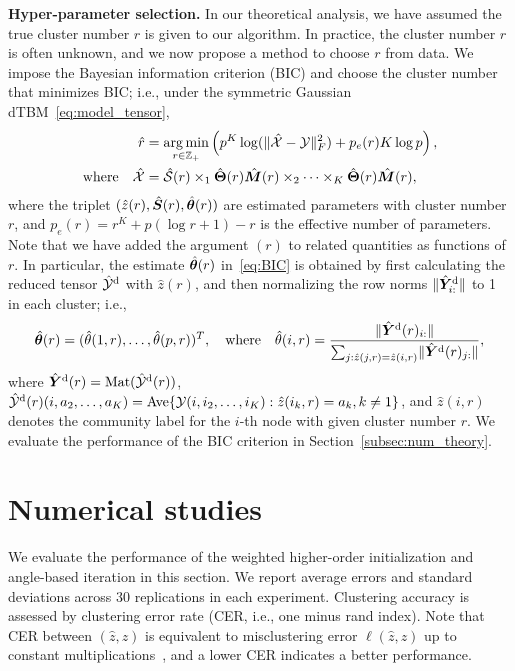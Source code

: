 \documentclass[lettersize,onecolumn,journal]{IEEEtran}
\theoremstyle{definition}
\theoremstyle{definition}
\newcommand{\of}[1]{\left(#1\right)}
\begin{document}
{\bf Hyper-parameter selection.} In our theoretical analysis, we have assumed the true cluster number $r$ is given to our algorithm. In practice, the cluster number $r$ is often unknown, and we now propose a method to choose $r$ from data. We impose the Bayesian information criterion (BIC) and choose the cluster number that minimizes BIC; i.e., under the symmetric Gaussian dTBM~\eqref{eq:model_tensor},
\begin{align}\label{eq:BIC}
 \hat r &= \argmin_{r \in \mathbb{Z}_+ } \of{p^K \log(\onormSize{}{\hat \tX - \tY}_F^2)  + p_e(r) K \log p},\\
 \text{where}  \quad \hat \tX &= \hat \tS(r) \times_1 \hat \mTheta(r) \hat \mM(r) \times_2 \cdots \times_K \hat \mTheta(r) \hat \mM(r),
\end{align}
where the triplet $(\hat z(r), \hat {\bm S}(r),\hat {\boldsymbol{\theta}}(r))$ are estimated parameters with cluster number $r$, and $p_e (r)= r^K + p(\log r + 1) - r$ is the effective number of parameters. Note that we have added the argument $(r)$ to related quantities as functions of $r$. In particular, the estimate $\hat {\boldsymbol{\theta}}(r)$ in~\eqref{eq:BIC} is obtained by first calculating the reduced tensor $\hat {\mathcal{Y}}^{\text{d}}$ with $\hat z(r)$, and then normalizing the row norms $\lVert\hat {\bm Y}_{i:}^{\text{d}}\rVert$ to 1 in each cluster; i.e., 
\begin{equation}
 \hat {\boldsymbol{\theta}}(r)=(\hat \theta(1,r),\ldots,\hat \theta(p,r))^T,\quad\text{where}\quad   \hat \theta(i,r) = \frac{\lVert\hat {\bm Y}^{\text{d}}(r)_{i:}\rVert}{\sum_{j: \hat z(j,r) =  \hat z(i,r)} \lVert\hat {\bm Y}^{\text{d}}(r)_{j:}\rVert},
\end{equation}
where $\hat {\bm Y}^{\text{d}}(r) = \text{Mat}(\hat {\mathcal{Y}}^{\text{d}}(r))$, $\hat {\mathcal{Y}}^{\text{d}}(r)(i,a_2,\ldots,a_K) =  \text{Ave}\{\mathcal{Y}(i,i_2,\ldots,i_K): \hat z(i_k, r) = a_k, k \neq 1 \}$, and $\hat z(i,r)$ denotes the community label for the $i$-th node with given cluster number $r$. We evaluate the performance of the BIC criterion in Section~\ref{subsec:num_theory}.


\section{Numerical studies}\label{sec:simulation}

 We evaluate the performance of the weighted higher-order initialization and angle-based iteration in this section. We report average errors and standard deviations across 30 replications in each experiment. Clustering accuracy is assessed by clustering error rate (CER, i.e., one minus rand index). Note that CER between $(\hat z, z)$ is equivalent to misclustering error $\ell(\hat z, z)$ up to constant multiplications~\citep{meilua2012local}, and a lower CER indicates a better performance.
\end{document}
